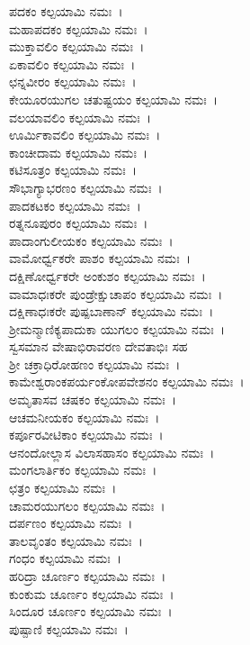 ಪದಕಂ ಕಲ್ಪಯಾಮಿ ನಮಃ~।\\
ಮಹಾಪದಕಂ ಕಲ್ಪಯಾಮಿ ನಮಃ~।\\
ಮುಕ್ತಾವಲಿಂ ಕಲ್ಪಯಾಮಿ ನಮಃ~।\\
ಏಕಾವಲಿಂ ಕಲ್ಪಯಾಮಿ ನಮಃ~।\\
ಛನ್ನವೀರಂ ಕಲ್ಪಯಾಮಿ ನಮಃ~।\\
ಕೇಯೂರಯುಗಲ ಚತುಷ್ಟಯಂ ಕಲ್ಪಯಾಮಿ ನಮಃ~।\\
ವಲಯಾವಲಿಂ ಕಲ್ಪಯಾಮಿ ನಮಃ~।\\
ಊರ್ಮಿಕಾವಲಿಂ ಕಲ್ಪಯಾಮಿ ನಮಃ~।\\
ಕಾಂಚೀದಾಮ ಕಲ್ಪಯಾಮಿ ನಮಃ~।\\
ಕಟಿಸೂತ್ರಂ ಕಲ್ಪಯಾಮಿ ನಮಃ~।\\
ಸೌಭಾಗ್ಯಾಭರಣಂ ಕಲ್ಪಯಾಮಿ ನಮಃ~।\\
ಪಾದಕಟಕಂ ಕಲ್ಪಯಾಮಿ ನಮಃ~।\\
ರತ್ನನೂಪುರಂ ಕಲ್ಪಯಾಮಿ ನಮಃ~।\\
ಪಾದಾಂಗುಲೀಯಕಂ ಕಲ್ಪಯಾಮಿ ನಮಃ~।\\
ವಾಮೋರ್ಧ್ವಕರೇ ಪಾಶಂ ಕಲ್ಪಯಾಮಿ ನಮಃ~।\\
ದಕ್ಷಿಣೋರ್ಧ್ವಕರೇ ಅಂಕುಶಂ ಕಲ್ಪಯಾಮಿ ನಮಃ~।\\
ವಾಮಾಧಃಕರೇ ಪುಂಡ್ರೇಕ್ಷುಚಾಪಂ ಕಲ್ಪಯಾಮಿ ನಮಃ~।\\
ದಕ್ಷಿಣಾಧಃಕರೇ ಪುಷ್ಪಬಾಣಾನ್ ಕಲ್ಪಯಾಮಿ ನಮಃ~।\\
ಶ್ರೀಮನ್ಮಾಣಿಕ್ಯಪಾದುಕಾ ಯುಗಲಂ ಕಲ್ಪಯಾಮಿ ನಮಃ~।\\
ಸ್ವಸಮಾನ ವೇಷಾಭಿರಾವರಣ ದೇವತಾಭಿಃ ಸಹ\\ ಶ್ರೀ ಚಕ್ರಾಧಿರೋಹಣಂ ಕಲ್ಪಯಾಮಿ ನಮಃ~।\\
ಕಾಮೇಶ್ವರಾಂಕಪರ್ಯಂಕೋಪವೇಶನಂ ಕಲ್ಪಯಾಮಿ ನಮಃ~।\\
ಅಮೃತಾಸವ ಚಷಕಂ ಕಲ್ಪಯಾಮಿ ನಮಃ~।\\
ಆಚಮನೀಯಕಂ ಕಲ್ಪಯಾಮಿ ನಮಃ~।\\
ಕರ್ಪೂರವೀಟಿಕಾಂ ಕಲ್ಪಯಾಮಿ ನಮಃ~।\\
ಆನಂದೋಲ್ಲಾಸ ವಿಲಾಸಹಾಸಂ ಕಲ್ಪಯಾಮಿ ನಮಃ~।\\
ಮಂಗಲಾರ್ತಿಕಂ ಕಲ್ಪಯಾಮಿ ನಮಃ~।\\
ಛತ್ರಂ ಕಲ್ಪಯಾಮಿ ನಮಃ~।\\
ಚಾಮರಯುಗಲಂ ಕಲ್ಪಯಾಮಿ ನಮಃ~।\\
ದರ್ಪಣಂ ಕಲ್ಪಯಾಮಿ ನಮಃ~।\\
ತಾಲವೃಂತಂ ಕಲ್ಪಯಾಮಿ ನಮಃ~।\\
ಗಂಧಂ ಕಲ್ಪಯಾಮಿ ನಮಃ~।\\
ಹರಿದ್ರಾ ಚೂರ್ಣಂ ಕಲ್ಪಯಾಮಿ ನಮಃ~।\\
ಕುಂಕುಮ ಚೂರ್ಣಂ ಕಲ್ಪಯಾಮಿ ನಮಃ~।\\
ಸಿಂದೂರ ಚೂರ್ಣಂ ಕಲ್ಪಯಾಮಿ ನಮಃ~।\\
ಪುಷ್ಪಾಣಿ ಕಲ್ಪಯಾಮಿ ನಮಃ~।
